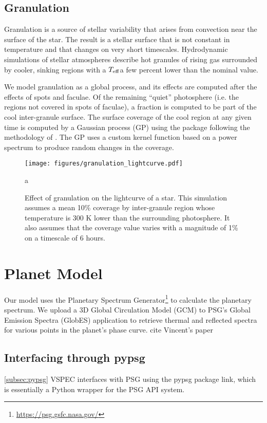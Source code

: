 \documentclass[twocolumn]{aastex631}
\newcommand{\teff}{$T_{\rm eff}$}
\newcommand{\TJ}[1]{\textcolor{tedcommentcolor}{#1}}
\begin{document}
\subsection{Granulation}
Granulation is a source of stellar variability that arises from convection near the surface of the star.
The result is a stellar surface that is not constant in temperature and that changes on very short timescales.
Hydrodynamic simulations of stellar atmospheres \citep[e.g.][]{magic2014} describe hot granules of rising gas surrounded by cooler,
sinking regions with a \teff a few percent lower than the nominal value.

We model granulation as a global process, and its effects are computed after the effects of spots and faculae.
Of the remaining ``quiet'' photosphere (i.e. the regions not covered in spots of faculae), a fraction is computed to be part of the cool
inter-granule surface. The surface coverage of the cool region at any given time is computed by a Gaussian process (GP) using
the  package \citep{foreman-mackey2024} following the methodology of \citet{gordon2020}.
The GP uses a custom kernel function based on a power spectrum \citep{anderson1990,kallinger2014} to produce random changes in the coverage.

\begin{figure}
    \centering
    \texttt{[image: figures/granulation\_lightcurve.pdf]}
    \caption{
        Effect of granulation on the lightcurve of a star. This simulation assumes a mean
        10\% coverage by inter-granule region whose temperature is 300 K lower than the surrounding photosphere.
        It also assumes that the coverage value varies with a magnitude of 1\% on a timescale of 6 hours.
        }
    \label{fig:gran_lc}
a\end{figure}

\section{Planet Model \label{sec:pl_model}}
Our model uses the Planetary Spectrum Generator\footnote{\href{https://psg.gsfc.nasa.gov/}{https://psg.gsfc.nasa.gov/}}
\citep[PSG,][]{villanueva2018} to calculate the planetary spectrum. We upload a 3D Global Circulation Model (GCM) to PSG's
Global Emission Spectra (GlobES) application to retrieve thermal and reflected spectra for various points in the planet's phase curve. \TJ{cite Vincent's paper}

\subsection{Interfacing through {\sc pypsg}}
\ref{subsec:pypsg}
{\sc VSPEC} interfaces with PSG using the {\sc pypsg} package \TJ{link}, which is essentially a Python wrapper for the PSG API system.
\end{document}
